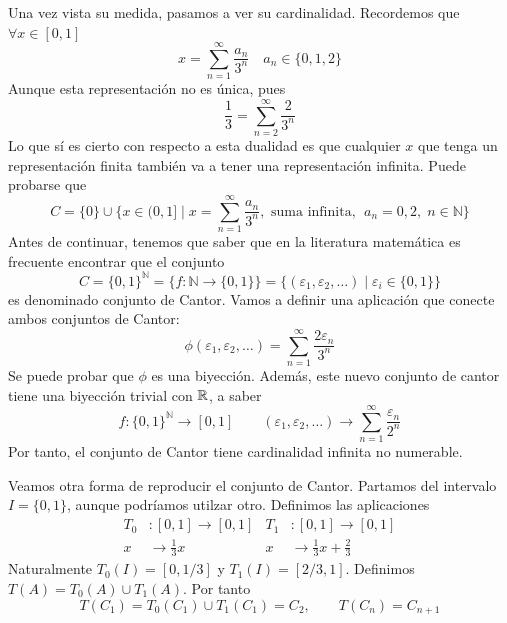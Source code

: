 \documentclass[FyPI.tex]{subfiles}
\begin{document}
Una vez vista su medida, pasamos a ver su cardinalidad. Recordemos que $\forall x \in [0,1]$ 
$$
x = \sum_{n=1}^\infty \frac{a_n}{3^n} \quad a_n\in \{0,1,2\}
$$
Aunque esta representación no es única, pues
$$
\frac{1}{3} = \sum_{n=2}^\infty \frac{2}{3^n}
$$
Lo que sí es cierto con respecto a esta dualidad es que cualquier $x$ que tenga un representación finita también va a tener una representación infinita. Puede probarse que
$$
C=\{0\}\cup\{x\in(0,1] \mid x = \sum_{n=1}^\infty \frac{a_n}{3^n},\text{ suma infinita, }\;a_n = 0,2,\; n \in \mathbb{N}\}
$$
Antes de continuar, tenemos que saber que en la literatura matemática es frecuente encontrar que el conjunto
$$
C=\{0,1\}^\mathbb{N} = \{f:\mathbb{N} \to \{0,1\}\} = \{(\varepsilon_1,\varepsilon_2,\dotsc)\mid \varepsilon_i \in \{0,1\}\}
$$
es denominado conjunto de Cantor. Vamos a definir una aplicación que conecte ambos conjuntos de Cantor:
$$
\phi(\varepsilon_1,\varepsilon_2,\dotsc) = \sum_{n=1}^\infty \frac{2\varepsilon_n}{3^n}
$$
Se puede probar que $\phi$ es una biyección. Además, este nuevo conjunto de cantor tiene una biyección trivial con $\mathbb{R}$, a saber
$$
f:\{0,1\}^\mathbb{N} \to [0,1] \qquad (\varepsilon_1,\varepsilon_2,\dotsc) \to \sum_{n=1}^{\infty} \frac{\varepsilon_n}{2^n}
$$
Por tanto, el conjunto de Cantor tiene cardinalidad infinita no numerable.

Veamos otra forma de reproducir el conjunto de Cantor. Partamos del intervalo $I=\{0,1\}$, aunque podríamos utilzar otro. Definimos las aplicaciones
\begin{align*}
T_0& : [0,1]\to [0,1] & T_1&:[0,1]\to [0,1] \\
x& \to \frac{1}{3}x & x &\to \frac{1}{3}x+\frac{2}{3}
\end{align*}
Naturalmente $T_0(I) = [0,1/3]$ y $T_1(I)=[2/3,1]$. Definimos $T(A)=T_0(A)\cup T_1(A)$. Por tanto
$$
T(C_1) = T_0(C_1)\cup T_1(C_1) = C_2, \qquad T(C_n) = C_{n+1}
$$
\end{document}
